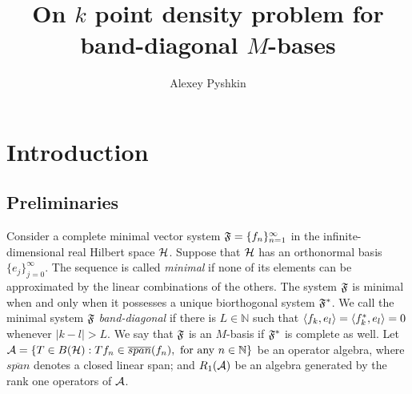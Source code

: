 \documentclass[12pt]{amsart}
\theoremstyle{case}
\begin{document}
\title{On $k$ point density problem for band-diagonal $M$-bases}
\author{Alexey Pyshkin}
\maketitle

\section{Introduction}
  \subsection{Preliminaries}
    Consider a complete minimal vector system $\fsys = \seq{f}$ in the infinite-dimensional real Hilbert space $\cal{H}$.
    Suppose that $\cal{H}$ has an orthonormal basis $\{e_j\}_{j=0}^\infty$.
    The sequence is called \emph{minimal} if none of its elements can be approximated by the linear combinations of the others.
    The system $\fsys$ is minimal when and only when it possesses a unique biorthogonal system $\fstarsys$.
    We call the minimal system $\fsys$ \emph{band-diagonal} if there is $L \in \mathbb{N}$ such that $\inner{f_k}{e_l} = \inner{f^*_k}{e_l} = 0$
      whenever $\lvert k - l \rvert > L$.
    We say that $\fsys$ is an $M$-basis if $\fstarsys$ is complete as well.
    Let ${\cal{A} = \{T\in B(\cal{H}): Tf_n \in \overline{span}(f_n), \text{ for any } n \in \mathbb{N}\}}$ be an operator algebra, where
      $\overline{span}$ denotes a closed linear span;
      and $R_1(\cal{A})$ be an algebra generated by the rank one operators of $\cal{A}$.
\end{document}
